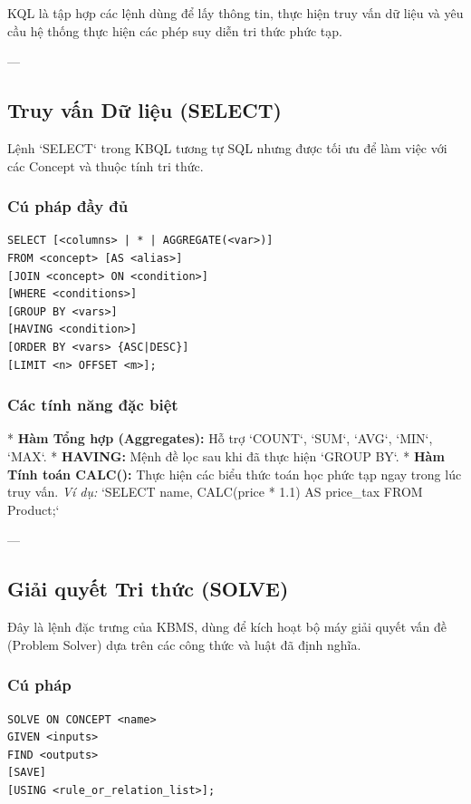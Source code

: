 KQL là tập hợp các lệnh dùng để lấy thông tin, thực hiện truy vấn dữ liệu và yêu cầu hệ thống thực hiện các phép suy diễn tri thức phức tạp.

---

\subsection{Truy vấn Dữ liệu (SELECT)}

Lệnh `SELECT` trong KBQL tương tự SQL nhưng được tối ưu để làm việc với các Concept và thuộc tính tri thức.

\subsubsection{Cú pháp đầy đủ}
\begin{verbatim}
SELECT [<columns> | * | AGGREGATE(<var>)]
FROM <concept> [AS <alias>]
[JOIN <concept> ON <condition>]
[WHERE <conditions>]
[GROUP BY <vars>] 
[HAVING <condition>]
[ORDER BY <vars> {ASC|DESC}]
[LIMIT <n> OFFSET <m>];
\end{verbatim}

\subsubsection{Các tính năng đặc biệt}
*   \textbf{Hàm Tổng hợp (Aggregates):} Hỗ trợ `COUNT`, `SUM`, `AVG`, `MIN`, `MAX`.
*   \textbf{HAVING:} Mệnh đề lọc sau khi đã thực hiện `GROUP BY`.
*   \textbf{Hàm Tính toán CALC():} Thực hiện các biểu thức toán học phức tạp ngay trong lúc truy vấn.
    \textit{Ví dụ:} `SELECT name, CALC(price * 1.1) AS price\_tax FROM Product;`

---

\subsection{Giải quyết Tri thức (SOLVE)}

Đây là lệnh đặc trưng của KBMS, dùng để kích hoạt bộ máy giải quyết vấn đề (Problem Solver) dựa trên các công thức và luật đã định nghĩa.

\subsubsection{Cú pháp}
\begin{verbatim}
SOLVE ON CONCEPT <name>
GIVEN <inputs>
FIND <outputs>
[SAVE]
[USING <rule_or_relation_list>];
\end{verbatim}

